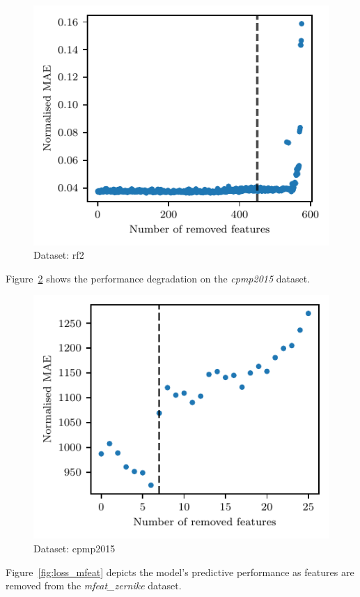 \documentclass[3p,review,authoryear]{elsarticle}
\begin{document}
\begin{figure}[h!]
    \centering
    \includegraphics{loss_rf2.pdf}
    \caption{Dataset: rf2}
    \label{fig:loss_rf2}
\end{figure}

Figure~\ref{fig:loss_cpm} shows the performance degradation on the \textit{cpmp2015} dataset.

\begin{figure}[h!]
    \centering
    \includegraphics{loss_cpm.pdf}
    \caption{Dataset: cpmp2015}
    \label{fig:loss_cpm}
\end{figure}

Figure~\ref{fig:loss_mfeat} depicts the model’s predictive performance as features are removed from the \textit{mfeat\_zernike} dataset.
\end{document}
